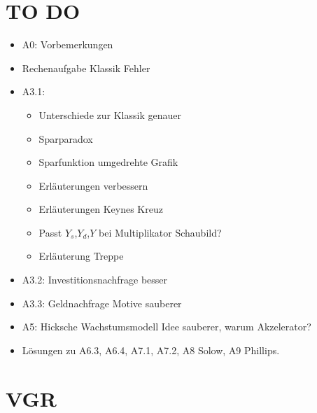 \documentclass{scrartcl}
\begin{document}
\section*{TO DO}
\begin{itemize}
  \item A0: Vorbemerkungen
  \item Rechenaufgabe Klassik Fehler
  \item A3.1:
  \begin{itemize}
    \item Unterschiede zur Klassik genauer
    \item Sparparadox
    \item Sparfunktion umgedrehte Grafik
    \item Erl\"{a}uterungen verbessern
    \item Erl\"{a}uterungen Keynes Kreuz
    \item Passt $Y_s$,$Y_d$,$Y$ bei Multiplikator Schaubild?
    \item Erl\"{a}uterung Treppe
  \end{itemize}
  \item A3.2: Investitionsnachfrage besser
  \item A3.3: Geldnachfrage Motive sauberer
  \item A5: Hicksche Wachstumsmodell Idee sauberer, warum Akzelerator?
  \item L\"{o}sungen zu A6.3, A6.4, A7.1, A7.2, A8 Solow, A9 Phillips.
\end{itemize}
\section{VGR}
\end{document}
